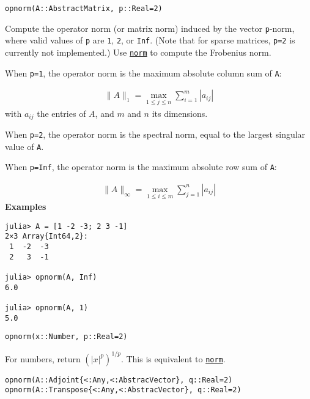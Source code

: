 \begin{adjustwidth}{2em}{0pt}


\begin{verbatim}
opnorm(A::AbstractMatrix, p::Real=2)
\end{verbatim}

Compute the operator norm (or matrix norm) induced by the vector \texttt{p}-norm, where valid values of \texttt{p} are \texttt{1}, \texttt{2}, or \texttt{Inf}. (Note that for sparse matrices, \texttt{p=2} is currently not implemented.) Use \hyperlink{898926013064269707}{\texttt{norm}} to compute the Frobenius norm.

When \texttt{p=1}, the operator norm is the maximum absolute column sum of \texttt{A}:

\begin{equation*}
\begin{split}\|A\|_1 = \max_{1 ≤ j ≤ n} \sum_{i=1}^m | a_{ij} |\end{split}\end{equation*}
with \(a_{ij}\) the entries of \(A\), and \(m\) and \(n\) its dimensions.

When \texttt{p=2}, the operator norm is the spectral norm, equal to the largest singular value of \texttt{A}.

When \texttt{p=Inf}, the operator norm is the maximum absolute row sum of \texttt{A}:

\begin{equation*}
\begin{split}\|A\|_\infty = \max_{1 ≤ i ≤ m} \sum _{j=1}^n | a_{ij} |\end{split}\end{equation*}
\textbf{Examples}


\begin{verbatim}
julia> A = [1 -2 -3; 2 3 -1]
2×3 Array{Int64,2}:
 1  -2  -3
 2   3  -1

julia> opnorm(A, Inf)
6.0

julia> opnorm(A, 1)
5.0
\end{verbatim}




\begin{lstlisting}
opnorm(x::Number, p::Real=2)
\end{lstlisting}

For numbers, return \(\left( |x|^p \right)^{1/p}\). This is equivalent to \hyperlink{898926013064269707}{\texttt{norm}}.




\begin{lstlisting}
opnorm(A::Adjoint{<:Any,<:AbstracVector}, q::Real=2)
opnorm(A::Transpose{<:Any,<:AbstracVector}, q::Real=2)
\end{lstlisting}


\end{adjustwidth}
